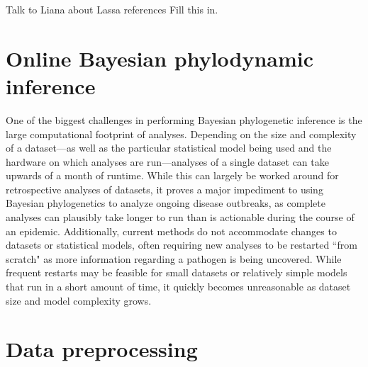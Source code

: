 Talk to Liana about Lassa references %
Fill this in.




\section{Online Bayesian phylodynamic inference} %

One of the biggest challenges in performing Bayesian phylogenetic inference is the large computational footprint of analyses.
Depending on the size and complexity of a dataset---as well as the particular statistical model being used and the hardware on which analyses are run---analyses of a single dataset can take upwards of a month of runtime.
While this can largely be worked around for retrospective analyses of datasets, it proves a major impediment to using Bayesian phylogenetics to analyze ongoing disease outbreaks, %
as complete analyses can plausibly take longer to run than is actionable during the course of an epidemic.
Additionally, current methods do not accommodate changes to datasets or statistical models, often requiring new analyses to be restarted ``from scratch" as more information regarding a pathogen is being uncovered.
While frequent restarts may be feasible for small datasets or relatively simple models that run in a short amount of time, it quickly becomes unreasonable as dataset size and model complexity grows.

\section{Data preprocessing} %

